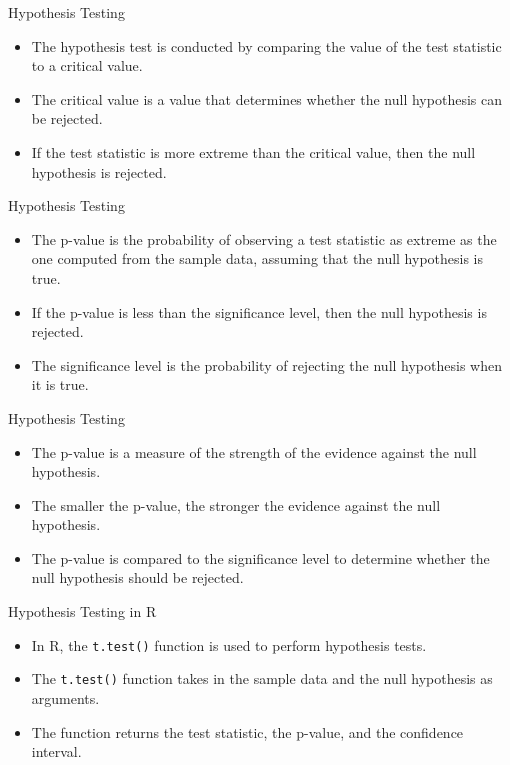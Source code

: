\documentclass[serif, 9pt, aspectratio=32]{beamer}
\begin{document}
\begin{frame}{Hypothesis Testing}
    \begin{itemize}
        \setlength{\itemsep}{2em}
        \item The hypothesis test is conducted by comparing the value of the test statistic to a critical value.
        \item The critical value is a value that determines whether the null hypothesis can be rejected.
        \item If the test statistic is more extreme than the critical value, then the null hypothesis is rejected.
    \end{itemize}
\end{frame}

\begin{frame}{Hypothesis Testing}
    \begin{itemize}
        \setlength{\itemsep}{2em}
        \item The p-value is the probability of observing a test statistic as extreme as the one computed from the sample data, assuming that the null hypothesis is true.
        \item If the p-value is less than the significance level, then the null hypothesis is rejected.
        \item The significance level is the probability of rejecting the null hypothesis when it is true.
    \end{itemize}
\end{frame}

\begin{frame}{Hypothesis Testing}
    \begin{itemize}
        \setlength{\itemsep}{2em}
        \item The p-value is a measure of the strength of the evidence against the null hypothesis.
        \item The smaller the p-value, the stronger the evidence against the null hypothesis.
        \item The p-value is compared to the significance level to determine whether the null hypothesis should be rejected.
    \end{itemize}
\end{frame}

\begin{frame}{Hypothesis Testing in R}
    \begin{itemize}
        \setlength{\itemsep}{2em}
        \item In R, the \texttt{t.test()} function is used to perform hypothesis tests.
        \item The \texttt{t.test()} function takes in the sample data and the null hypothesis as arguments.
        \item The function returns the test statistic, the p-value, and the confidence interval.
    \end{itemize}
\end{frame}
\end{document}
